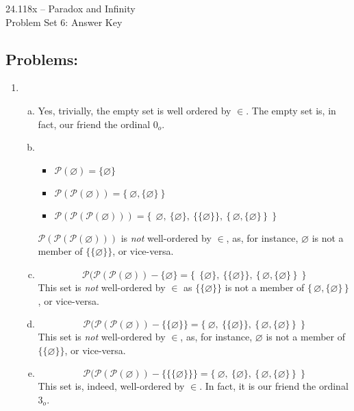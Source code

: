 \documentclass[12pt,a4paper]{article}
\begin{document}
\begin{center} {\large 24.118x -- Paradox and Infinity \\ \vspace{1mm}}
 {\large Problem Set 6: Answer Key \\ \vspace{1mm}}
 
\end{center}
\vspace{3mm}


\subsection*{Problems:}


\begin{enumerate}

\item \begin{enumerate}[(a)]
	\item Yes, trivially, the empty set is well ordered by $\in$. The empty set is, in fact, our friend the ordinal $0_o$.
	\item \begin{itemize}
		\item $\mathcal{P}(\varnothing)=\{\varnothing\}$
		\item $\mathcal{P}(\mathcal{P}(\varnothing))=\{\  \varnothing, \{\varnothing\}\  \}$
		\item $\mathcal{P}(\mathcal{P}(\mathcal{P}(\varnothing)))=\{\ \  \varnothing,\ \{\varnothing\}, \ \{\{\varnothing\}\}, \ \{\,\varnothing,\{\varnothing\} \,\}\ \ \}$
		\end{itemize}
	$\mathcal{P}(\mathcal{P}(\mathcal{P}(\varnothing)))$ is \emph{not} well-ordered by $\in$, as, for instance, $\varnothing$ is not a member of $\{\{\varnothing\}\}$, or vice-versa.
	\item $$\mathcal{P}(\mathcal{P}(\mathcal{P}(\varnothing))-\{\varnothing\} = \{\ \ \{\varnothing\}, \ \{\{\varnothing\}\}, \ \{\,\varnothing,\{\varnothing\} \,\}\ \ \}$$ This set is \emph{not} well-ordered by $\in$ as $\{\{\varnothing\}\}$ is not a member of $\{\,\varnothing,\{\varnothing\}\, \}$, or vice-versa.
	\item $$\mathcal{P}(\mathcal{P}(\mathcal{P}(\varnothing))-\{\{\varnothing\}\} = \{\  \varnothing, \ \{\{\varnothing\}\}, \ \{\,\varnothing,\{\varnothing\} \,\}\ \ \}$$ This set is \emph{not} well-ordered by $\in$, as, for instance, $\varnothing$ is not a member of $\{\{\varnothing\}\}$, or vice-versa.
	\item $$\mathcal{P}(\mathcal{P}(\mathcal{P}(\varnothing))-\{\{\{\varnothing\}\}\} = \{\  \varnothing, \ \{\varnothing\}, \ \{\,\varnothing,\{\varnothing\} \,\}\ \ \}$$ This set is, indeed, well-ordered by $\in$. In fact, it is our friend the ordinal $3_o$.
	\end{enumerate}
		

\end{enumerate}
\end{document}
